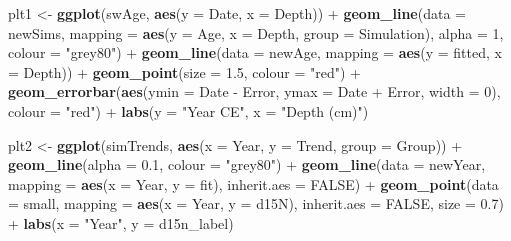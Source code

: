 \documentclass[12pt,]{article}
\newenvironment{Shaded}{\begin{snugshade}}{\end{snugshade}}
\newcommand{\KeywordTok}[1]{\textcolor[rgb]{0.13,0.29,0.53}{\textbf{{#1}}}}
\newcommand{\DataTypeTok}[1]{\textcolor[rgb]{0.13,0.29,0.53}{{#1}}}
\newcommand{\DecValTok}[1]{\textcolor[rgb]{0.00,0.00,0.81}{{#1}}}
\newcommand{\FloatTok}[1]{\textcolor[rgb]{0.00,0.00,0.81}{{#1}}}
\newcommand{\StringTok}[1]{\textcolor[rgb]{0.31,0.60,0.02}{{#1}}}
\newcommand{\OtherTok}[1]{\textcolor[rgb]{0.56,0.35,0.01}{{#1}}}
\newcommand{\NormalTok}[1]{{#1}}
\begin{document}
\begin{Shaded}
\begin{Highlighting}[]
\NormalTok{plt1 <-}\StringTok{ }\KeywordTok{ggplot}\NormalTok{(swAge, }\KeywordTok{aes}\NormalTok{(}\DataTypeTok{y =} \NormalTok{Date, }\DataTypeTok{x =} \NormalTok{Depth)) +}
\StringTok{    }\KeywordTok{geom_line}\NormalTok{(}\DataTypeTok{data =} \NormalTok{newSims,}
              \DataTypeTok{mapping =} \KeywordTok{aes}\NormalTok{(}\DataTypeTok{y =} \NormalTok{Age, }\DataTypeTok{x =} \NormalTok{Depth, }\DataTypeTok{group =} \NormalTok{Simulation),}
              \DataTypeTok{alpha =} \DecValTok{1}\NormalTok{, }\DataTypeTok{colour =} \StringTok{"grey80"}\NormalTok{) +}
\StringTok{    }\KeywordTok{geom_line}\NormalTok{(}\DataTypeTok{data =} \NormalTok{newAge, }\DataTypeTok{mapping =} \KeywordTok{aes}\NormalTok{(}\DataTypeTok{y =} \NormalTok{fitted, }\DataTypeTok{x =} \NormalTok{Depth)) +}
\StringTok{    }\KeywordTok{geom_point}\NormalTok{(}\DataTypeTok{size =} \FloatTok{1.5}\NormalTok{, }\DataTypeTok{colour =} \StringTok{"red"}\NormalTok{) +}
\StringTok{    }\KeywordTok{geom_errorbar}\NormalTok{(}\KeywordTok{aes}\NormalTok{(}\DataTypeTok{ymin =} \NormalTok{Date -}\StringTok{ }\NormalTok{Error, }\DataTypeTok{ymax =} \NormalTok{Date +}\StringTok{ }\NormalTok{Error, }\DataTypeTok{width =} \DecValTok{0}\NormalTok{),}
                  \DataTypeTok{colour =} \StringTok{"red"}\NormalTok{) +}
\StringTok{    }\KeywordTok{labs}\NormalTok{(}\DataTypeTok{y =} \StringTok{"Year CE"}\NormalTok{, }\DataTypeTok{x =} \StringTok{"Depth (cm)"}\NormalTok{)}

\NormalTok{plt2 <-}\StringTok{ }\KeywordTok{ggplot}\NormalTok{(simTrends, }\KeywordTok{aes}\NormalTok{(}\DataTypeTok{x =} \NormalTok{Year, }\DataTypeTok{y =} \NormalTok{Trend, }\DataTypeTok{group =} \NormalTok{Group)) +}
\StringTok{    }\KeywordTok{geom_line}\NormalTok{(}\DataTypeTok{alpha =} \FloatTok{0.1}\NormalTok{, }\DataTypeTok{colour =} \StringTok{"grey80"}\NormalTok{) +}
\StringTok{    }\KeywordTok{geom_line}\NormalTok{(}\DataTypeTok{data =} \NormalTok{newYear,}
              \DataTypeTok{mapping =} \KeywordTok{aes}\NormalTok{(}\DataTypeTok{x =} \NormalTok{Year, }\DataTypeTok{y =} \NormalTok{fit), }\DataTypeTok{inherit.aes =} \OtherTok{FALSE}\NormalTok{) +}
\StringTok{    }\KeywordTok{geom_point}\NormalTok{(}\DataTypeTok{data =} \NormalTok{small,}
               \DataTypeTok{mapping =} \KeywordTok{aes}\NormalTok{(}\DataTypeTok{x =} \NormalTok{Year, }\DataTypeTok{y =} \NormalTok{d15N),}
               \DataTypeTok{inherit.aes =} \OtherTok{FALSE}\NormalTok{, }\DataTypeTok{size =} \FloatTok{0.7}\NormalTok{) +}
\StringTok{    }\KeywordTok{labs}\NormalTok{(}\DataTypeTok{x =} \StringTok{"Year"}\NormalTok{, }\DataTypeTok{y =} \NormalTok{d15n_label)}


\end{Highlighting}
\end{Shaded}
\end{document}
